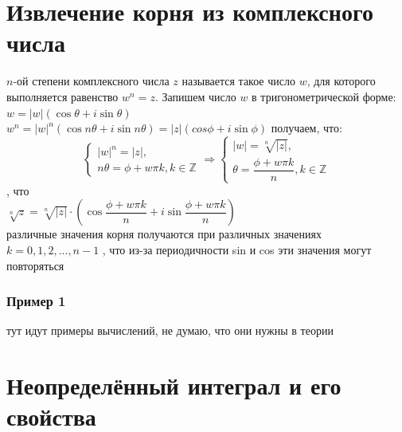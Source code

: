 \documentclass[oneside]{book}
\begin{document}
\begin{itemize}
\begin{enumerate}
\chapter{Извлечение корня из комплексного числа}
 $n$-ой степени комплексного числа $z$ называется такое число $w$, для которого выполняется равенство $w^n=z$. Запишем число $w$ в тригонометрической форме: $w=|w|(\cos\theta+i\sin\theta)$\\
$w^n=|w|^n(\cos n\theta+i\sin n\theta)=|z|(cos\phi+i\sin\phi)$
 получаем, что:
\begin{equation}
	\begin{cases}
		|w|^n=|z|,\\
		n\theta=\phi+w\pi k, k \in \mathbb{Z}
	\end{cases}
	\Rightarrow
	\begin{cases}
		|w|=\sqrt[n]{|z|},\\
		\theta=\dfrac{\phi+w\pi k}{n}, k \in \mathbb{Z}
	\end{cases}
\end{equation}
, что\\
$\sqrt[n]{z}=\sqrt[n]{|z|}\cdot (\cos\dfrac{\phi+w\pi k}{n}+i\sin\dfrac{\phi+w\pi k}{n})$\\
различные значения корня получаются при различных значениях $k=0, 1, 2, ..., n-1$
, что из-за периодичности sin и cos эти значения могут повторяться
\subsection{Пример 1}
тут идут примеры вычислений, не думаю, что они нужны в теории

\setcounter{chapter}{31}
\chapter[Неопределённый интеграл]{Неопределённый интеграл и его свойства}

\end{enumerate}
\end{itemize}
\end{document}
